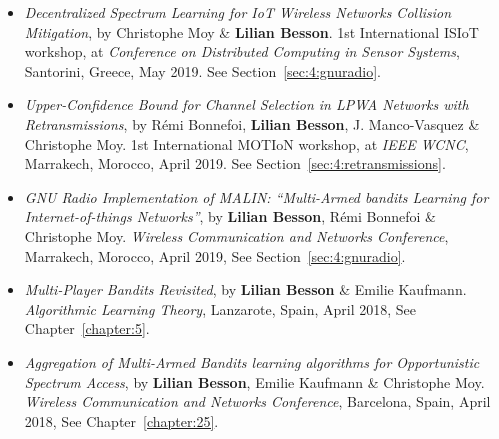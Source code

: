 \begin{itemize}
\item
    \emph{Decentralized Spectrum Learning for IoT Wireless Networks Collision Mitigation},
    by Christophe Moy \& \textbf{Lilian Besson}.
    1st International ISIoT workshop,
    at \emph{Conference on Distributed Computing in Sensor Systems},
    Santorini, Greece, May 2019.
    See Section~\ref{sec:4:gnuradio}.
    \cite{MoyBesson2019}

\item
    \emph{Upper-Confidence Bound for Channel Selection in LPWA Networks with Retransmissions},
    by Rémi Bonnefoi, \textbf{Lilian Besson}, J. Manco-Vasquez \& Christophe Moy.
    1st International MOTIoN workshop,
    at \emph{IEEE WCNC}, Marrakech, Morocco, April 2019.
    See Section~\ref{sec:4:retransmissions}.
    \cite{Bonnefoi2019WCNC}

\item
    \emph{GNU Radio Implementation of MALIN: ``Multi-Armed bandits Learning for Internet-of-things Networks''},
    by \textbf{Lilian Besson}, Rémi Bonnefoi \& Christophe Moy.
    \emph{Wireless Communication and Networks Conference},
    Marrakech, Morocco, April 2019,
    See Section~\ref{sec:4:gnuradio}.
    \cite{Besson2019WCNC}

\item
    \emph{Multi-Player Bandits Revisited},
    by \textbf{Lilian Besson} \& Emilie Kaufmann.
    \emph{Algorithmic Learning Theory},
    Lanzarote, Spain, April 2018,
    See Chapter~\ref{chapter:5}.
    \cite{Besson2018ALT}

\item
    \emph{Aggregation of Multi-Armed Bandits learning algorithms for Opportunistic Spectrum Access},
    by \textbf{Lilian Besson}, Emilie Kaufmann \& Christophe Moy.
    \emph{Wireless Communication and Networks Conference},
    Barcelona, Spain, April 2018,
    See Chapter~\ref{chapter:25}.
    \cite{Besson2018WCNC}


\end{itemize}

